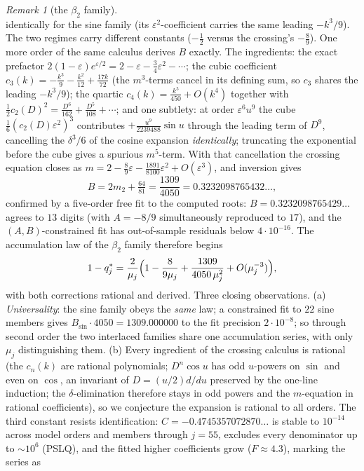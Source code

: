 \documentclass[11pt]{article}
\theoremstyle{plain}
\theoremstyle{definition}
\theoremstyle{remark}
\newtheorem{remark}[theorem]{Remark}
\begin{document}
\begin{remark}[the $\beta_2$ family]
\[\]
identically for the sine family (its $\varepsilon^2$-coefficient carries the same leading
$-k^3/9$). The two regimes carry different constants ($-\tfrac12$ versus the crossing's
$-\tfrac89$). One more order of the same calculus derives $B$ exactly. The ingredients:
the exact prefactor $2(1-\varepsilon)e^{\varepsilon/2}=2-\varepsilon-\tfrac34\varepsilon^2-\cdots$;
the cubic coefficient $c_3(k)=-\tfrac{k^3}9-\tfrac{k^2}{12}+\tfrac{17k}{72}$ (the $m^3$-terms
cancel in its defining sum, so $c_3$ shares the leading $-k^3/9$); the quartic
$c_4(k)=\tfrac{k^5}{450}+O(k^4)$ together with $\tfrac12c_2(D)^2=\tfrac{D^6}{162}+\tfrac{D^5}{108}+\cdots$;
and one subtlety: at order $\varepsilon^6u^9$ the cube $\tfrac16(c_2(D)\varepsilon^2)^3$
contributes $+\tfrac{u^9}{2239488}\sin u$ through the leading term of $D^9$, cancelling the
$\delta^3/6$ of the cosine expansion \emph{identically}; truncating the exponential before the
cube gives a spurious $m^5$-term. With that cancellation the crossing equation closes as
$m=2-\tfrac89\varepsilon-\tfrac{1891}{8100}\varepsilon^2+O(\varepsilon^3)$, and inversion gives
\[
   B=2m_2+\tfrac{64}{81}=\frac{1309}{4050}=0.3232098765432\ldots,
\]
confirmed by a five-order free fit to the computed roots: $B=0.3232098765429\ldots$ agrees to
$13$ digits (with $A=-8/9$ simultaneously reproduced to $17$), and the $(A,B)$-constrained fit has
out-of-sample residuals below $4\cdot10^{-16}$. The accumulation law of the $\beta_2$ family
therefore begins
\[
   1-q^\ast_j=\frac{2}{\mu_j}\Bigl(1-\frac{8}{9\mu_j}+\frac{1309}{4050\,\mu_j^2}
   +O(\mu_j^{-3})\Bigr),
\]
with both corrections rational and derived. Three closing observations. (a) \emph{Universality}:
the sine family obeys the \emph{same} law; a constrained fit to $22$ sine members gives
$B_{\sin}\cdot4050=1309.000000$ to the fit precision $2\cdot10^{-8}$; so through second order
the two interlaced families share one accumulation series, with only $\mu_j$ distinguishing them.
(b) Every ingredient of the crossing calculus is rational (the $c_n(k)$ are rational polynomials;
$D^n\cos u$ has odd $u$-powers on $\sin$ and even on $\cos$, an invariant of $D=(u/2)d/du$
preserved by the one-line induction; the $\delta$-elimination therefore stays in odd powers and
the $m$-equation in rational coefficients), so we conjecture the expansion is rational to all
orders. The third constant resists identification: $C=-0.4745357072870\ldots$ is stable to
$10^{-14}$ across model orders and members through $j=55$, excludes every denominator up to
$\sim10^6$ (PSLQ), and the fitted higher coefficients grow ($F\approx4.3$), marking the series as

\end{remark}
\end{document}
